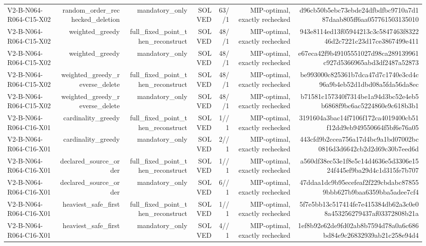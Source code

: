 {\begin{longtable}{lrrrrrr}
V2-B-N064-R064-C15-X02 & random\_order\_rechecked\_deletion & mandatory\_only & SOLVED & 63//1 & MIP-optimal, exactly rechecked & d96cb50b5ebc73ebde24dfbdfbc9710a7d187daab805ff6aa057761503135010 \\
V2-B-N064-R064-C15-X02 & weighted\_greedy & full\_fixed\_point\_then\_reconstruct & SOLVED & 48//1 & MIP-optimal, exactly rechecked & 943e8114ed13f05944213c3c5847463f832246d2c7221c23d17ce3867499e411 \\
V2-B-N064-R064-C15-X02 & weighted\_greedy & mandatory\_only & SOLVED & 48//1 & MIP-optimal, exactly rechecked & e67eca42f9b49105551027d98ca289139961c927d5366965abd3df2487a52873 \\
V2-B-N064-R064-C15-X02 & weighted\_greedy\_reverse\_delete & full\_fixed\_point\_then\_reconstruct & SOLVED & 48//1 & MIP-optimal, exactly rechecked & be993000c825361b7dca47d7c1740e3cd4c96a9b4eb52d1dbd08a5fda56da8ec \\
V2-B-N064-R064-C15-X02 & weighted\_greedy\_reverse\_delete & mandatory\_only & SOLVED & 48//1 & MIP-optimal, exactly rechecked & b71581c157340f7314be1a94d3bc52e4eb5b6868f9bc6ac5224860e9c618b3b1 \\
V2-B-N064-R064-C16-X01 & cardinality\_greedy & full\_fixed\_point\_then\_reconstruct & SOLVED & 1//1 & MIP-optimal, exactly rechecked & 3191604a3bac14f7106f172ca4019400cb51f12dd9eb949550664f5bf6e76a05 \\
V2-B-N064-R064-C16-X01 & cardinality\_greedy & mandatory\_only & SOLVED & 2//1 & MIP-optimal, exactly rechecked & 443cfd9b2ccea756a17d4bc9a1bd07002bc0816d3d6642cb2d2d69c30b7eed6d \\
V2-B-N064-R064-C16-X01 & declared\_source\_order & full\_fixed\_point\_then\_reconstruct & SOLVED & 1//1 & MIP-optimal, exactly rechecked & a560df38ec53e1f8e5c14d4636e5d3306e1524f445ef9ba29d4c1d315fe7b707 \\
V2-B-N064-R064-C16-X01 & declared\_source\_order & mandatory\_only & SOLVED & 6//1 & MIP-optimal, exactly rechecked & 47ddaa1dc9b95ecefeaf2f229cbdabc878559bbb627b9baa6359bba5adee7cf4 \\
V2-B-N064-R064-C16-X01 & heaviest\_safe\_first & full\_fixed\_point\_then\_reconstruct & SOLVED & 1//1 & MIP-optimal, exactly rechecked & 5f7e5bb13c517414fe7e415384db62a3c0e08a453256279437af03372808b21a \\
V2-B-N064-R064-C16-X01 & heaviest\_safe\_first & mandatory\_only & SOLVED & 4//1 & MIP-optimal, exactly rechecked & 1ef8b92e62de9fd02ab8b7594d78a0a6c686bd84e9c26832939ab21c258e94d4 \\

\end{longtable}}
